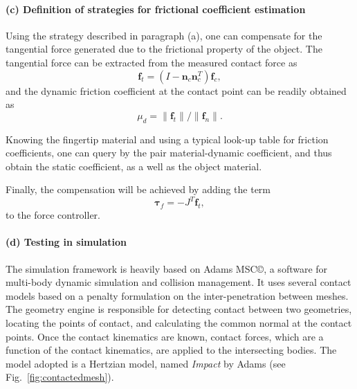 

\paragraph{(c) Definition of strategies for frictional coefficient estimation}
Using the strategy described in paragraph (a), one can compensate for the tangential force generated due to the frictional property of the object. The tangential force can be extracted from the measured contact force as
\begin{equation}
    \mathbf{f}_t = (I-\mathbf{n}_{c}\mathbf{n}^T_{c})\mathbf{f}_c,
\end{equation}
and the dynamic friction coefficient at the contact point can be readily obtained as
\begin{equation}
    \mu_{d} = \lVert{\mathbf{f}_{t}}\rVert/\lVert{\mathbf{f}_{n}}\rVert.
\end{equation}

Knowing the fingertip material and using a typical look-up table for friction coefficients, one can query by the pair material-dynamic coefficient, and thus obtain the static coefficient, as a well as the object material.

Finally, the compensation will be achieved by adding the term
\begin{equation}
    \boldsymbol{\tau}_f=-J^T \mathbf{f}_t,
\end{equation}
to the force controller.

\paragraph{(d) Testing in simulation}
The simulation framework is heavily based on Adams MSC\copyright, a software for multi-body dynamic simulation and collision management. It uses several contact models based on a penalty formulation on the inter-penetration between meshes. The geometry engine is responsible for detecting contact between two geometries, locating the points of contact, and calculating the common normal at the contact points. Once the contact kinematics are known, contact forces, which are a function of the contact kinematics, are applied to the intersecting bodies. The model adopted is a Hertzian model, named \emph{Impact} by Adams (see Fig.~\ref{fig:contactedmesh}).

